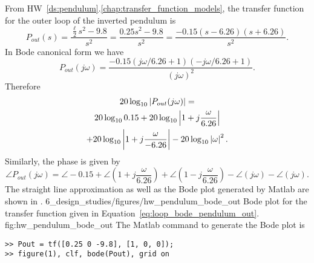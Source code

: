 From HW~\ref{ds:pendulum}.\ref{chap:transfer_function_models}, the transfer function for the outer loop of the inverted pendulum is 
\begin{equation}\label{eq:soln_b20out_tf}
P_{out}(s) = \frac{\frac{\ell}{2}s^2-9.8}{s^2} = 
\frac{0.25s^2-9.8}{s^2} = \frac{-0.15(s-6.26)(s+6.26)}{s^2}. 
\end{equation}
In Bode canonical form we have
\[
P_{out}(j\omega) = \frac{-0.15(j\omega/6.26+1)(-j\omega/6.26+1)}{(j\omega)^2}.
\]
Therefore
\begin{multline} \label{eq:loop_bode_pendulum_out}
20\log_{10}\left|P_{out}(j\omega)\right|= \\
	20\log_{10} 0.15 + 	20\log_{10}\left|1+j\frac{\omega}{6.26}\right| \\
	+ 	20\log_{10}\left|1+j\frac{\omega}{-6.26}\right|
	-20\log_{10}\left|\omega\right|^2.
\end{multline}
Similarly, the phase is given by
\[
\angle P_{out}(j\omega) = 
	\angle -0.15 
	+ \angle (1+j\frac{\omega}{6.26})
	+ \angle (1-j\frac{\omega}{6.26})
	- \angle (j\omega)
	- \angle (j\omega).
\]
The straight line approximation as well as the Bode plot generated by Matlab are shown in .
	{6_design_studies/figures/hw_pendulum_bode_out}
	{Bode plot for the transfer function given in Equation~\eqref{eq:loop_bode_pendulum_out}.}
	{fig:hw_pendulum_bode_out}
The Matlab command to generate the Bode plot is
\begin{lstlisting}
>> Pout = tf([0.25 0 -9.8], [1, 0, 0]);
>> figure(1), clf, bode(Pout), grid on
\end{lstlisting}
